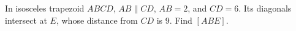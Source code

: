 In isosceles trapezoid $ABCD$, $AB\parallel CD$, $AB=2$, and $CD=6$. Its diagonals intersect at $E$, whose distance from $CD$ is $9$. Find $[ABE]$.
